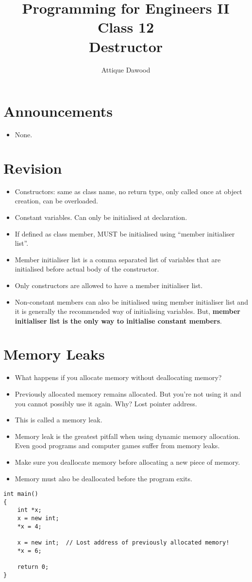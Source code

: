 \documentclass[12pt,a4paper]{article}
\title{\vspace{-2cm}Programming for Engineers II\\Class 12\\Destructor}
\author{Attique Dawood}
\begin{document}
\maketitle
\section{Announcements}
\begin{itemize}
\item None.
\end{itemize}
\section{Revision}
\begin{itemize}
\item Constructors: same as class name, no return type, only called once at object creation, can be overloaded.
\item Constant variables. Can only be initialised at declaration.
\item If defined as class member, MUST be initialised using ``member initialiser list''.
\item Member initialiser list is a comma separated list of variables that are initialised before actual body of the constructor.
\item Only constructors are allowed to have a member initialiser list.
\item Non-constant members can also  be initialised using member initialiser list and it is generally the recommended way of initialising variables. But, \textbf{member initialiser list is the only way to initialise constant members}.
\end{itemize}
\section{Memory Leaks}
\begin{itemize}
\item What happens if you allocate memory without deallocating memory?
\item Previously allocated memory remains allocated. But you're not using it and you cannot possibly use it again. Why? Lost pointer address.
\item This is called a memory leak.
\item Memory leak is the greatest pitfall when using dynamic memory allocation. Even good programs and computer games suffer from memory leaks.
\item Make sure you deallocate memory before allocating a new piece of memory.
\item Memory must also be deallocated before the program exits.
\end{itemize}
\begin{lstlisting}[caption={Typical Memory Leak}]
int main()
{
	int *x;
	x = new int;
	*x = 4;

	x = new int;  // Lost address of previously allocated memory!
	*x = 6;
	
	return 0;
}
\end{lstlisting}
\end{document}
